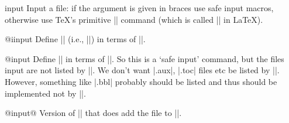 \begin{multicols}

    \begin{teX}
\long{}
    \end{teX}


  \begin{docCmd}{input}{}
    Input a file: if the argument is given in braces use safe input
    macros, otherwise use \TeX's primitive || command (which is
    called |\@@input| in \LaTeX).
  \end{docCmd}

    \begin{teX}
\def
    \end{teX}


 \begin{docCmd}{@iinput}{}
    Define |\@iinput| (i.e., ||) in terms of
    |\InputIfIfileExists|.
 \end{docCmd}
 
    \begin{teX}
\def\@iinput#1{%
  \InputIfFileExists{#1}{}%
  {\filename@parse{#1}%
   \edef\reserved@a{\noexpand\@missingfileerror
     {\filename@area\filename@base}%
     {\ifx\filename@ext\relax tex\else\filename@ext\fi}}%
   \reserved@a}}
    \end{teX}


 \begin{docCmd}{@input}{}
    Define |\@input| in terms of |\IffileExists|.
    So this is a `safe input' command, but the files input are not
    listed by |\listfiles|.
    We don't want |.aux|, |.toc| files etc be listed by |\listfiles|.
    However, something like |.bbl| probably should be listed and thus
    should be implemented not by |\@input|.
 \end{docCmd}
    \begin{teX}
\def\@input#1{%
  \IfFileExists{#1}{\@@input\@filef@und}{\typeout{No file #1.}}}
    \end{teX}


 \begin{docCmd}{@input@}{}
 Version of |\@input| that does add the file to |\@filelist|.
 \end{docCmd}
    \begin{teX}
\def\@input@#1{\InputIfFileExists{#1}{}{\typeout{No file #1.}}}
    \end{teX}



\end{multicols}
